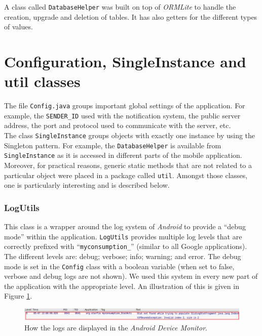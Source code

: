 \documentclass[a4paper, oneside, 11pt]{book}
\begin{document}
A class called \texttt{DatabaseHelper} was built on top of \textit{ORMLite} to handle the creation, upgrade and deletion of tables. It has also getters for the different types of values. 

\section{Configuration, SingleInstance and util classes}
The file \texttt{Config.java} groups important global settings of the application. For example, the \texttt{SENDER\_ID} used with the notification system, the public server address, the port and protocol used to communicate with the server, etc.\\

The class \texttt{SingleInstance} groups objects with exactly one instance by using the Singleton pattern. For example, the \texttt{DatabaseHelper} is available from \texttt{SingleInstance} as it is accessed in different parts of the mobile application.\\

Moreover, for practical reasons, generic static methods that are not related to a particular object were placed in a package called \texttt{util}. Amongst those classes, one is particularly interesting and is described below.

\subsubsection{LogUtils}
This class is a wrapper around the log system of \textit{Android} to provide a “debug mode” within the application. \texttt{LogUtils} provides multiple log levels that are correctly prefixed with “\texttt{myconsumption\_}” (similar to all Google applications). The different levels are: debug; verbose; info; warning; and error. The debug mode is set in the \texttt{Config} class with a boolean variable (when set to false, verbose and debug logs are not shown). We used this system in every new part of the application with the appropriate level. An illustration of this is given in Figure \ref{fig:logs}.

\begin{figure}[htbp]
	\centerline{\includegraphics[width=1\textwidth]{logs.png}}
	\caption{How the logs are displayed in the \textit{Android Device Monitor}.}
	\label{fig:logs}
\end{figure}
\end{document}
